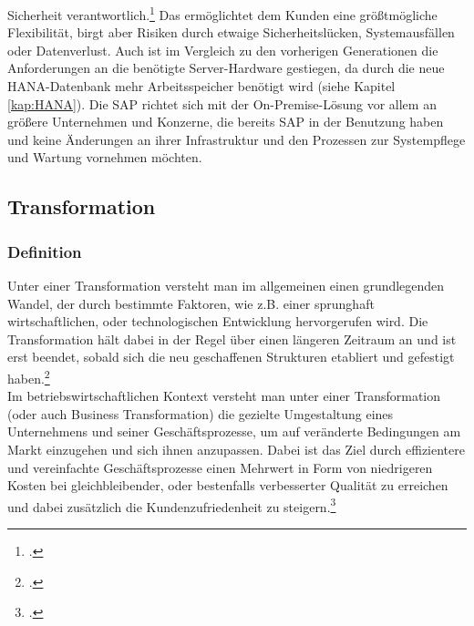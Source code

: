 Sicherheit verantwortlich.\footcite[Vgl.][]{rz10-s4hana} Das ermöglichtet dem Kunden eine größtmögliche Flexibilität, birgt aber Risiken durch etwaige Sicherheitslücken, Systemausfällen oder Datenverlust. Auch ist im Vergleich zu den vorherigen Generationen die Anforderungen an die benötigte Server-Hardware gestiegen, da durch die neue HANA-Datenbank mehr Arbeitsspeicher benötigt wird (siehe Kapitel \ref{kap:HANA}). Die SAP richtet sich mit der On-Premise-Lösung vor allem an größere Unternehmen und Konzerne, die bereits SAP in der Benutzung haben und keine Änderungen an ihrer Infrastruktur und den Prozessen zur Systempflege und Wartung vornehmen möchten.  

\subsection{Transformation}
\subsubsection{Definition}
Unter einer Transformation versteht man im allgemeinen einen grundlegenden Wandel, der durch bestimmte Faktoren, wie z.B. einer sprunghaft wirtschaftlichen, oder technologischen Entwicklung hervorgerufen wird. Die Transformation hält dabei in der Regel über einen längeren Zeitraum an und ist erst beendet, sobald sich die neu geschaffenen Strukturen etabliert und gefestigt haben.\footcite[Vgl.][]{difu}\\ Im betriebswirtschaftlichen Kontext versteht man unter einer Transformation (oder auch Business Transformation) die gezielte Umgestaltung eines Unternehmens und seiner Geschäftsprozesse, um auf veränderte Bedingungen am Markt einzugehen und sich ihnen anzupassen. Dabei ist das Ziel durch effizientere und vereinfachte Geschäftsprozesse einen Mehrwert in Form von niedrigeren Kosten bei gleichbleibender, oder bestenfalls verbesserter Qualität zu erreichen und dabei zusätzlich die Kundenzufriedenheit zu steigern.\footcite[Vgl.][]{leanix}

